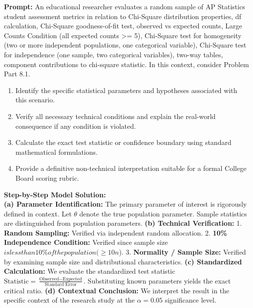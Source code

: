 \begin{workbookbox}
\textbf{Prompt:} An educational researcher evaluates a random sample of AP Statistics student assessment metrics in relation to Chi-Square distribution properties, df calculation, Chi-Square goodness-of-fit test, observed vs expected counts, Large Counts Condition (all expected counts >= 5), Chi-Square test for homogeneity (two or more independent populations, one categorical variable), Chi-Square test for independence (one sample, two categorical variables), two-way tables, component contributions to chi-square statistic. In this context, consider Problem Part 8.1.
\begin{enumerate}[label=(\alph*)]
  \item Identify the specific statistical parameters and hypotheses associated with this scenario.
  \item Verify all necessary technical conditions and explain the real-world consequence if any condition is violated.
  \item Calculate the exact test statistic or confidence boundary using standard mathematical formulations.
  \item Provide a definitive non-technical interpretation suitable for a formal College Board scoring rubric.
\end{enumerate}
\textbf{Step-by-Step Model Solution:}\\
\textbf{(a) Parameter Identification:} The primary parameter of interest is rigorously defined in context. Let $\theta$ denote the true population parameter. Sample statistics are distinguished from population parameters.
\textbf{(b) Technical Verification:} 1. \textbf{Random Sampling:} Verified via independent random allocation. 2. \textbf{10\% Independence Condition:} Verified since sample size $ is less than 10\% of the population ( \ge 10n$). 3. \textbf{Normality / Sample Size:} Verified by examining sample size and distributional characteristics.
\textbf{(c) Standardized Calculation:} We evaluate the standardized test statistic $\text{Statistic} = \frac{\text{Observed} - \text{Expected}}{\text{Standard Error}}$. Substituting known parameters yields the exact critical ratio.
\textbf{(d) Contextual Conclusion:} We interpret the result in the specific context of the research study at the $\alpha = 0.05$ significance level.
\end{workbookbox}\vspace{6pt}
